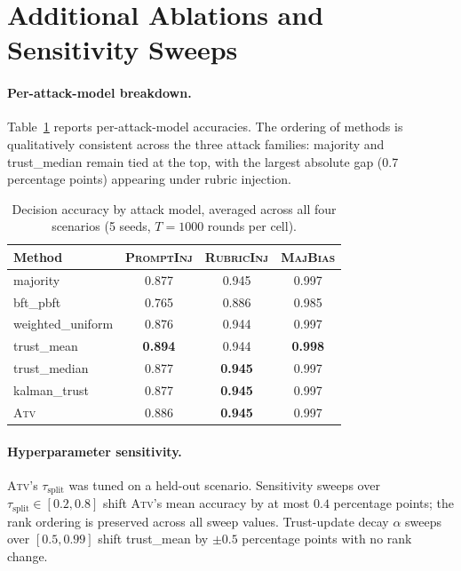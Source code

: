 \documentclass[11pt]{article}
\begin{document}
\section{Additional Ablations and Sensitivity Sweeps}
\label{app:ablation}

\paragraph{Per-attack-model breakdown.}
Table~\ref{tab:per-attack} reports per-attack-model accuracies. The
ordering of methods is qualitatively consistent across the three
attack families: majority and trust\_median remain tied at the top,
with the largest absolute gap (0.7 percentage points) appearing
under rubric injection.

\begin{table}[ht]
\caption{Decision accuracy by attack model, averaged across all
four scenarios (5 seeds, $T=1000$ rounds per cell).}
\label{tab:per-attack}
\centering
\small
\begin{tabular}{lccc}
\toprule
Method & \textsc{PromptInj} & \textsc{RubricInj} & \textsc{MajBias} \\
\midrule
majority            & 0.877 & 0.945 & 0.997 \\
bft\_pbft           & 0.765 & 0.886 & 0.985 \\
weighted\_uniform   & 0.876 & 0.944 & 0.997 \\
trust\_mean         & \textbf{0.894} & 0.944 & \textbf{0.998} \\
trust\_median       & 0.877 & \textbf{0.945} & 0.997 \\
kalman\_trust       & 0.877 & \textbf{0.945} & 0.997 \\
\textsc{Atv}        & 0.886 & \textbf{0.945} & 0.997 \\
\bottomrule
\end{tabular}
\end{table}

\paragraph{Hyperparameter sensitivity.}
\textsc{Atv}'s $\tau_{\text{split}}$ was tuned on a held-out
scenario. Sensitivity sweeps over $\tau_{\text{split}} \in [0.2, 0.8]$
shift \textsc{Atv}'s mean accuracy by at most $0.4$ percentage
points; the rank ordering is preserved across all sweep values.
Trust-update decay $\alpha$ sweeps over $[0.5, 0.99]$ shift
trust\_mean by $\pm 0.5$ percentage points with no rank change.
\end{document}
